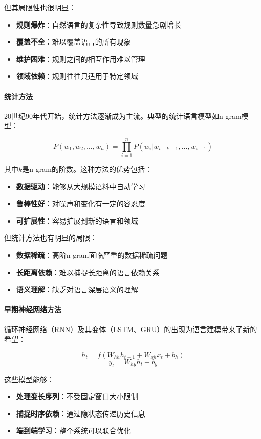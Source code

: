 但其局限性也很明显：
\begin{itemize}
\item \textbf{规则爆炸}：自然语言的复杂性导致规则数量急剧增长
\item \textbf{覆盖不全}：难以覆盖语言的所有现象
\item \textbf{维护困难}：规则之间的相互作用难以管理
\item \textbf{领域依赖}：规则往往只适用于特定领域
\end{itemize}

\paragraph{统计方法}
20世纪90年代开始，统计方法逐渐成为主流。典型的统计语言模型如n-gram模型：

$$P(w_1, w_2, \ldots, w_n) = \prod_{i=1}^n P(w_i | w_{i-k+1}, \ldots, w_{i-1})$$

其中$k$是n-gram的阶数。这种方法的优势包括：
\begin{itemize}
\item \textbf{数据驱动}：能够从大规模语料中自动学习
\item \textbf{鲁棒性好}：对噪声和变化有一定的容忍度
\item \textbf{可扩展性}：容易扩展到新的语言和领域
\end{itemize}

但统计方法也有明显的局限：
\begin{itemize}
\item \textbf{数据稀疏}：高阶n-gram面临严重的数据稀疏问题
\item \textbf{长距离依赖}：难以捕捉长距离的语言依赖关系
\item \textbf{语义理解}：缺乏对语言深层语义的理解
\end{itemize}

\paragraph{早期神经网络方法}
循环神经网络（RNN）及其变体（LSTM、GRU）的出现为语言建模带来了新的希望：

$$h_t = f(W_{hh}h_{t-1} + W_{xh}x_t + b_h)$$
$$y_t = W_{hy}h_t + b_y$$

这些模型能够：
\begin{itemize}
\item \textbf{处理变长序列}：不受固定窗口大小限制
\item \textbf{捕捉时序依赖}：通过隐状态传递历史信息
\item \textbf{端到端学习}：整个系统可以联合优化
\end{itemize}

